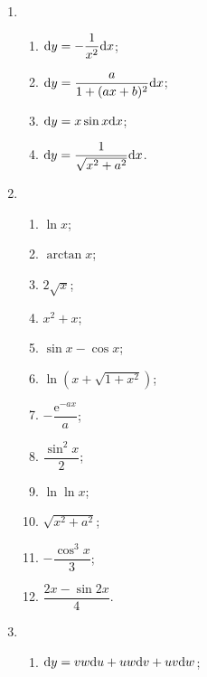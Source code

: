 % 
\begin{enumerate}
    \item %
        \begin{enumerate}[(1)]
            \item %
                $\mathrm{d} y = -\dfrac{1}{x^2}\mathrm{d} x$;
            \item %
                $\mathrm{d} y = \dfrac{a}{1 + (ax+b)^2}\mathrm{d} x$;
            \item %
                $\mathrm{d} y = x\sin x\mathrm{d} x$;
            \item %
                $\mathrm{d} y = \dfrac{1}{\sqrt{x^2 + a^2}}\mathrm{d} x$.
        \end{enumerate}
    \item %
        \begin{enumerate}[(1)]
            \item %
                $\ln x$;
            \item %
                $\arctan x$;
            \item %
                $2\sqrt{x}$;
            \item %
                $x^2 + x$;
            \item %
                $\sin x - \cos x$;
            \item %
                $\ln(x + \sqrt{1+x^2})$;
            \item %
                $-\dfrac{\mathrm{e}^{-ax}}{a}$;
            \item %
                $\dfrac{\sin^2x}{2}$;
            \item %
                $\ln\ln x$;
            \item %
                $\sqrt{x^2 + a^2}$;
            \item %
                $-\dfrac{\cos^3x}{3}$;
            \item %
                $\dfrac{2x - \sin2x}{4}$.
        \end{enumerate}
    \item %
        \begin{enumerate}[(1)]
            \item %
                $\mathrm{d} y = vw\mathrm{d} u + uw\mathrm{d} v + uv\mathrm{d} w$;

\end{enumerate}
\end{enumerate}
